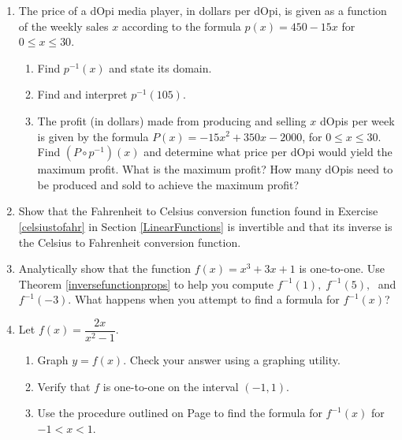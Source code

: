 \begin{enumerate}
\setcounter{enumi}{\value{HW}}

\item  The price of a dOpi media player, in dollars per dOpi, is given as a function of the weekly sales $x$ according to the formula $p(x) = 450-15x$ for $0 \leq x \leq 30$.

\begin{enumerate}

\item  Find $p^{-1}(x)$ and state its domain.

\item  Find and interpret $p^{-1}(105)$.

\item  The profit (in dollars) made from producing and selling $x$ dOpis per week is given by the formula $P(x)= -15x^2+350x-2000$, for $0 \leq x \leq 30$.  Find $\left(P \circ p^{-1}\right)(x)$ and determine what price per dOpi would yield the maximum profit.  What is the maximum profit?  How many dOpis need to be produced and sold to achieve the maximum profit?
\end{enumerate}

\item Show that the Fahrenheit to Celsius conversion function found in Exercise \ref{celsiustofahr} in Section \ref{LinearFunctions} is invertible and that its inverse is the Celsius to Fahrenheit conversion function.

\item Analytically show that the function $f(x) = x^3 + 3x + 1$ is one-to-one.  Use Theorem \ref{inversefunctionprops} to help you compute $f^{-1}(1), \; f^{-1}(5), \;$ and $f^{-1}(-3)$.  What happens when you attempt to find a formula for $f^{-1}(x)$?


\item  Let $f(x) = \dfrac{2x}{x^2-1}$.  

\begin{enumerate}

\item  Graph $y = f(x)$.  Check your answer using a graphing utility.

\item Verify that $f$ is one-to-one on the interval $(-1,1)$.  

\item Use the procedure outlined on Page \pageref{inverseprocedure} to find the formula for $f^{-1}(x)$ for $-1 < x < 1$.


\end{enumerate}
\end{enumerate}
